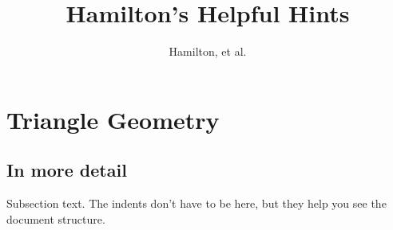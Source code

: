 \documentclass[draft, letterpaper, 12pt]{article}
\author{Hamilton, et al.}
\title{Hamilton's Helpful Hints}
\begin{document}
  
\maketitle  
\section{Triangle Geometry}    
     \subsection{In more detail}\label{sec:subsectionmoredetail}  
          Subsection text. The indents don’t have to be here,  
          but they help you see the document structure.  
\end{document}
